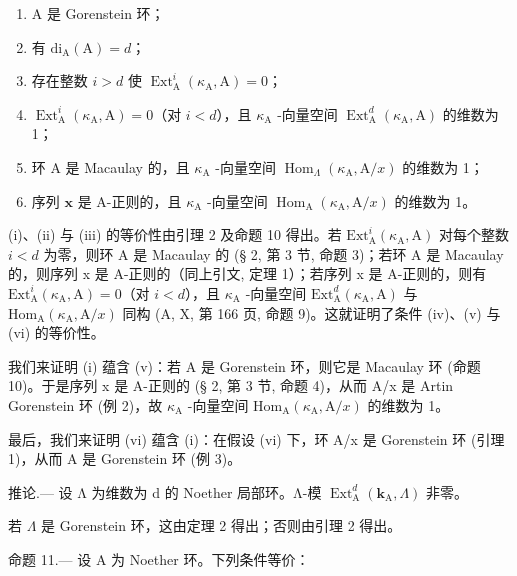 \begin{enumerate}
\def\labelenumi{(\roman{enumi})}
\item
  A 是 Gorenstein 环；
\item
  有 \(\mathrm{di}_{\mathrm{A}}(\mathrm{A}) = d\)；
\item
  存在整数 \(i>d\) 使 \(\operatorname{Ext}_{\mathrm{A}}^{i}(\kappa_{\mathrm{A}},\mathrm{A})=0\)；
\item
  \(\operatorname{Ext}_{\mathrm{A}}^{i}(\kappa_{\mathrm{A}},\mathrm{A}) = 0\)（对 \(i < d\)），且 \(\kappa_{\mathrm{A}}\) -向量空间 \(\operatorname{Ext}_{\mathrm{A}}^{d}(\kappa_{\mathrm{A}},\mathrm{A})\) 的维数为 1；
\item
  环 A 是 Macaulay 的，且 \(\kappa_{\mathrm{A}}\) -向量空间 \(\operatorname{Hom}_{\Lambda}(\kappa_{\mathrm{A}}, \mathrm{A}/x)\) 的维数为 1；
\item
  序列 \(\mathbf{x}\) 是 A-正则的，且 \(\kappa_{\mathrm{A}}\) -向量空间 \(\operatorname{Hom}_{\mathrm{A}}(\kappa_{\mathrm{A}},\mathrm{A} / x)\) 的维数为 1。
\end{enumerate}

(i)、(ii) 与 (iii) 的等价性由引理 2 及命题 10 得出。若 \(\mathrm{Ext}_{\mathrm{A}}^{i}(\kappa_{\mathrm{A}},\mathrm{A})\) 对每个整数 \(i < d\) 为零，则环 A 是 Macaulay 的 (§ 2, 第 3 节, 命题 3)；若环 A 是 Macaulay 的，则序列 x 是 A-正则的（同上引文, 定理 1）；若序列 x 是 A-正则的，则有 \(\mathrm{Ext}_{\mathrm{A}}^{i}(\kappa_{\mathrm{A}},\mathrm{A}) = 0\)（对 \(i < d\)），且 \(\kappa_{\mathrm{A}}\) -向量空间 \(\mathrm{Ext}_{\mathrm{A}}^{d}(\kappa_{\mathrm{A}},\mathrm{A})\) 与 \(\mathrm{Hom}_{\mathrm{A}}(\kappa_{\mathrm{A}},\mathrm{A}/x)\) 同构 (A, X, 第 166 页, 命题 9)。这就证明了条件 (iv)、(v) 与 (vi) 的等价性。

我们来证明 (i) 蕴含 (v)：若 A 是 Gorenstein 环，则它是 Macaulay 环 (命题 10)。于是序列 x 是 A-正则的 (§ 2, 第 3 节, 命题 4)，从而 A/x 是 Artin Gorenstein 环 (例 2)，故 \(\kappa_{\mathrm{A}}\) -向量空间 \(\mathrm{Hom}_{\mathrm{A}}(\kappa_{\mathrm{A}}, \mathrm{A}/x)\) 的维数为 1。

最后，我们来证明 (vi) 蕴含 (i)：在假设 (vi) 下，环 A/x 是 Gorenstein 环 (引理 1)，从而 A 是 Gorenstein 环 (例 3)。

推论.--- 设 Λ 为维数为 d 的 Noether 局部环。Λ-模 \(\operatorname{Ext}_{\mathrm{A}}^{d}(\mathbf{k}_{\mathrm{A}},\Lambda)\) 非零。

若 \(\Lambda\) 是 Gorenstein 环，这由定理 2 得出；否则由引理 2 得出。

命题 11.--- 设 A 为 Noether 环。下列条件等价：

